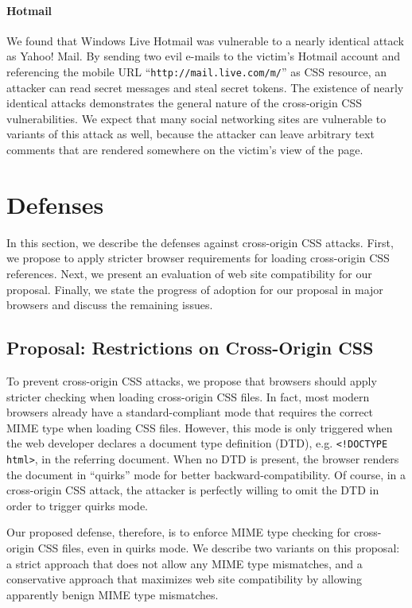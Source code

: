 \documentclass{acm_proc_article-sp}
\begin{document}
\paragraph{Hotmail}
We found that Windows Live Hotmail was vulnerable to a nearly identical attack as Yahoo! Mail. By sending two evil e-mails to the victim's Hotmail account and referencing the mobile URL ``\texttt{http://mail.live.com/m/}'' as CSS resource, an attacker can read secret messages and steal secret tokens.
The existence of nearly identical attacks demonstrates the general nature of the cross-origin CSS vulnerabilities. We expect that many social networking sites are vulnerable to variants of this attack as well, because the attacker can leave arbitrary text comments that are rendered somewhere on the victim's view of the page.

\section{Defenses} \label{sec:defenses}
In this section, we describe the defenses against cross-origin CSS attacks.
First, we propose to apply stricter browser requirements for loading
cross-origin CSS references. Next, we present an evaluation of web site
compatibility for our proposal. Finally, we state the progress of adoption for
our proposal in major browsers and discuss the remaining issues.

\subsection{Proposal: Restrictions on Cross-Origin CSS}
To prevent cross-origin
CSS attacks, we propose that browsers should apply stricter checking when
loading cross-origin CSS files. In fact, most modern browsers already have a
standard-compliant mode that requires the correct MIME type when loading CSS
files. However, this mode is only triggered when the web developer declares a
document type definition (DTD), e.g. \verb|<!DOCTYPE html>|, in the referring
document. When no DTD is present, the browser renders the document in
``quirks'' mode for better backward-compatibility. Of course, in a
cross-origin CSS attack, the attacker is perfectly willing to omit the DTD in
order to trigger quirks mode.

Our proposed defense, therefore, is to enforce MIME type checking for
cross-origin CSS files, even in quirks mode. We describe two variants on this
proposal: a strict approach that does not allow any MIME type mismatches, and
a conservative approach that maximizes web site compatibility by allowing
apparently benign MIME type mismatches.
\end{document}
